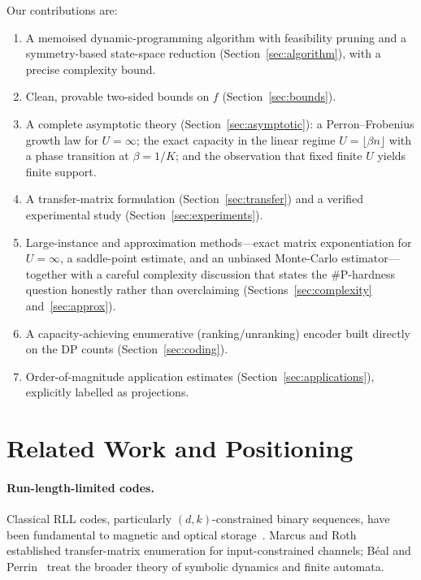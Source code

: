 \documentclass[a4paper,12pt]{article}
\begin{document}
Our contributions are:
\begin{enumerate}
    \item A memoised dynamic-programming algorithm with feasibility
          pruning and a symmetry-based state-space reduction
          (Section~\ref{sec:algorithm}), with a precise complexity
          bound.
    \item Clean, provable two-sided bounds on $f$
          (Section~\ref{sec:bounds}).
    \item A complete asymptotic theory (Section~\ref{sec:asymptotic}):
          a Perron--Frobenius growth law for $U=\infty$; the exact
          capacity in the linear regime $U=\lfloor\beta n\rfloor$ with
          a phase transition at $\beta=1/K$; and the observation that
          fixed finite $U$ yields finite support.
    \item A transfer-matrix formulation
          (Section~\ref{sec:transfer}) and a verified experimental
          study (Section~\ref{sec:experiments}).
    \item Large-instance and approximation methods---exact matrix
          exponentiation for $U=\infty$, a saddle-point estimate, and
          an unbiased Monte-Carlo estimator---together with a careful
          complexity discussion that states the $\#\mathrm{P}$-hardness
          question honestly rather than overclaiming
          (Sections~\ref{sec:complexity} and~\ref{sec:approx}).
    \item A capacity-achieving enumerative (ranking/unranking) encoder
          built directly on the DP counts (Section~\ref{sec:coding}).
    \item Order-of-magnitude application estimates
          (Section~\ref{sec:applications}), explicitly labelled as
          projections.
\end{enumerate}

\section{Related Work and Positioning}
\label{sec:related}

\paragraph{Run-length-limited codes.}
Classical RLL codes, particularly $(d,k)$-constrained binary
sequences, have been fundamental to magnetic and optical
storage~\cite{immink2004}.  Marcus and Roth~\cite{marcus1991}
established transfer-matrix enumeration for input-constrained
channels; B\'{e}al and Perrin~\cite{beal2009} treat the broader theory
of symbolic dynamics and finite automata.
\end{document}
